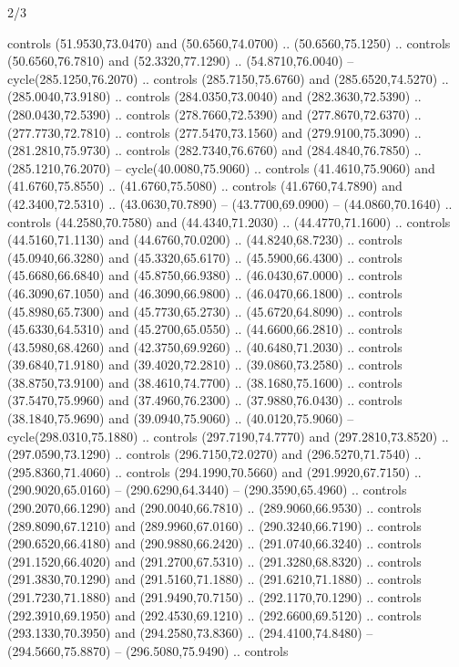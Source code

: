 \begin{flagdescription}{2/3}
\begin{scope}[xshift=0.5\flaglength,yshift=0.5\flagwidth,scale=\stretchfactor]
\begin{scope}[scale=0.001645\flagwidth,yshift=65mm,xshift=-63mm]
\begin{scope}[y=0.80pt, x=0.80pt, yscale=-1,]
\begin{scope}[cm={{1.33333,0.0,0.0,1.33333,(0.0,1e-05)}}]
  controls (51.9530,73.0470) and (50.6560,74.0700) .. (50.6560,75.1250) ..
  controls (50.6560,76.7810) and (52.3320,77.1290) .. (54.8710,76.0040) --
  cycle(285.1250,76.2070) .. controls (285.7150,75.6760) and (285.6520,74.5270)
  .. (285.0040,73.9180) .. controls (284.0350,73.0040) and (282.3630,72.5390) ..
  (280.0430,72.5390) .. controls (278.7660,72.5390) and (277.8670,72.6370) ..
  (277.7730,72.7810) .. controls (277.5470,73.1560) and (279.9100,75.3090) ..
  (281.2810,75.9730) .. controls (282.7340,76.6760) and (284.4840,76.7850) ..
  (285.1210,76.2070) -- cycle(40.0080,75.9060) .. controls (41.4610,75.9060) and
  (41.6760,75.8550) .. (41.6760,75.5080) .. controls (41.6760,74.7890) and
  (42.3400,72.5310) .. (43.0630,70.7890) -- (43.7700,69.0900) --
  (44.0860,70.1640) .. controls (44.2580,70.7580) and (44.4340,71.2030) ..
  (44.4770,71.1600) .. controls (44.5160,71.1130) and (44.6760,70.0200) ..
  (44.8240,68.7230) .. controls (45.0940,66.3280) and (45.3320,65.6170) ..
  (45.5900,66.4300) .. controls (45.6680,66.6840) and (45.8750,66.9380) ..
  (46.0430,67.0000) .. controls (46.3090,67.1050) and (46.3090,66.9800) ..
  (46.0470,66.1800) .. controls (45.8980,65.7300) and (45.7730,65.2730) ..
  (45.6720,64.8090) .. controls (45.6330,64.5310) and (45.2700,65.0550) ..
  (44.6600,66.2810) .. controls (43.5980,68.4260) and (42.3750,69.9260) ..
  (40.6480,71.2030) .. controls (39.6840,71.9180) and (39.4020,72.2810) ..
  (39.0860,73.2580) .. controls (38.8750,73.9100) and (38.4610,74.7700) ..
  (38.1680,75.1600) .. controls (37.5470,75.9960) and (37.4960,76.2300) ..
  (37.9880,76.0430) .. controls (38.1840,75.9690) and (39.0940,75.9060) ..
  (40.0120,75.9060) -- cycle(298.0310,75.1880) .. controls (297.7190,74.7770)
  and (297.2810,73.8520) .. (297.0590,73.1290) .. controls (296.7150,72.0270)
  and (296.5270,71.7540) .. (295.8360,71.4060) .. controls (294.1990,70.5660)
  and (291.9920,67.7150) .. (290.9020,65.0160) -- (290.6290,64.3440) --
  (290.3590,65.4960) .. controls (290.2070,66.1290) and (290.0040,66.7810) ..
  (289.9060,66.9530) .. controls (289.8090,67.1210) and (289.9960,67.0160) ..
  (290.3240,66.7190) .. controls (290.6520,66.4180) and (290.9880,66.2420) ..
  (291.0740,66.3240) .. controls (291.1520,66.4020) and (291.2700,67.5310) ..
  (291.3280,68.8320) .. controls (291.3830,70.1290) and (291.5160,71.1880) ..
  (291.6210,71.1880) .. controls (291.7230,71.1880) and (291.9490,70.7150) ..
  (292.1170,70.1290) .. controls (292.3910,69.1950) and (292.4530,69.1210) ..
  (292.6600,69.5120) .. controls (293.1330,70.3950) and (294.2580,73.8360) ..
  (294.4100,74.8480) -- (294.5660,75.8870) -- (296.5080,75.9490) .. controls

\end{scope}
\end{scope}
\end{scope}
\end{scope}
\end{flagdescription}
